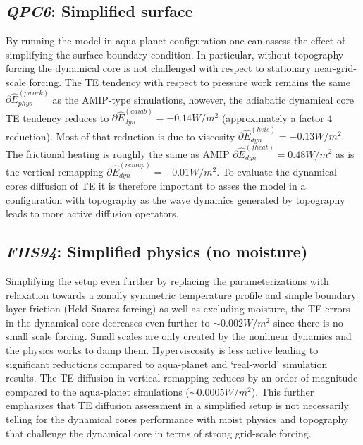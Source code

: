 \documentclass[draft,linenumbers]{agujournal}
\newcommand*{\gi}[1]{\widehat{#1}}
\begin{document}

\subsection{{\em{QPC6}}: Simplified surface}\label{sec:QPC6}
By running the model in aqua-planet configuration one can assess the effect of simplifying the surface boundary condition. In particular, without topography forcing the dynamical core is not challenged with respect to stationary near-grid-scale forcing. The TE tendency with respect to pressure work {\color{red}{error}} remains the same $\partial \gi{E}_{phys}^{({pwork})}$ as the AMIP-type simulations, however, the adiabatic dynamical core TE tendency reduces to $\partial \gi{E}_{dyn}^{({adiab})}=-0.14 W/m^2$ (approximately a factor 4 reduction). Most of that reduction is due to viscosity $\partial \gi{E}_{dyn}^{(hvis)}=-0.13 W/m^2$. The frictional heating is roughly the same as AMIP $\partial \gi{E}_{dyn}^{(fheat)}=0.48 W/m^2$ as is the vertical remapping  $\partial \gi{E}_{dyn}^{(remap)}=-0.01 W/m^2$. To evaluate the dynamical cores diffusion of TE it is therefore important to asses the model in a configuration with topography as the wave dynamics generated by topography leads to more active diffusion operators.
\subsection{{\em{FHS94}}: Simplified physics (no moisture)}\label{sec:FHS94}
Simplifying the setup even further by replacing the parameterizations with relaxation towards a zonally symmetric temperature profile and simple boundary layer friction (Held-Suarez forcing) as well as excluding moisture, the TE errors in the dynamical core decreases even further to $\sim 0.002W/m^2$ since there is no small scale forcing. Small scales are only created by the nonlinear dynamics and the physics works to damp them. Hyperviscosity is less active leading to significant reductions compared to aqua-planet and `real-world' simulation results. The TE diffusion in vertical remapping reduces by an order of magnitude compared to the aqua-planet simulations ($\sim 0.0005W/m^2$). This further emphasizes that TE diffusion assessment in a simplified setup is not necessarily telling for the dynamical cores performance with moist physics and topography that challenge the dynamical core in terms of strong grid-scale forcing.
\end{document}
